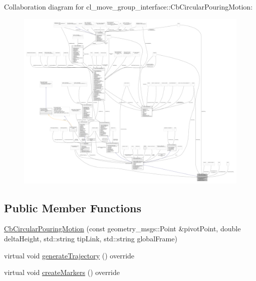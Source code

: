 Collaboration diagram for cl\+\_\+move\+\_\+group\+\_\+interface\+:\+:Cb\+Circular\+Pouring\+Motion\+:
\nopagebreak
\begin{figure}[H]
\begin{center}
\leavevmode
\includegraphics[width=350pt]{classcl__move__group__interface_1_1CbCircularPouringMotion__coll__graph}
\end{center}
\end{figure}
\subsection*{Public Member Functions}
\begin{DoxyCompactItemize}
\item 
\hyperlink{classcl__move__group__interface_1_1CbCircularPouringMotion_ae5d136014f6e9cacc5270c0b35b71b18}{Cb\+Circular\+Pouring\+Motion} (const geometry\+\_\+msgs\+::\+Point \&pivot\+Point, double delta\+Height, std\+::string tip\+Link, std\+::string global\+Frame)
\item 
virtual void \hyperlink{classcl__move__group__interface_1_1CbCircularPouringMotion_a9150bb3731082aad3af2d7d6e067a344}{generate\+Trajectory} () override
\item 
virtual void \hyperlink{classcl__move__group__interface_1_1CbCircularPouringMotion_a26d603b1d9bdbf5b71da6c1c4af2c322}{create\+Markers} () override
\end{DoxyCompactItemize}
